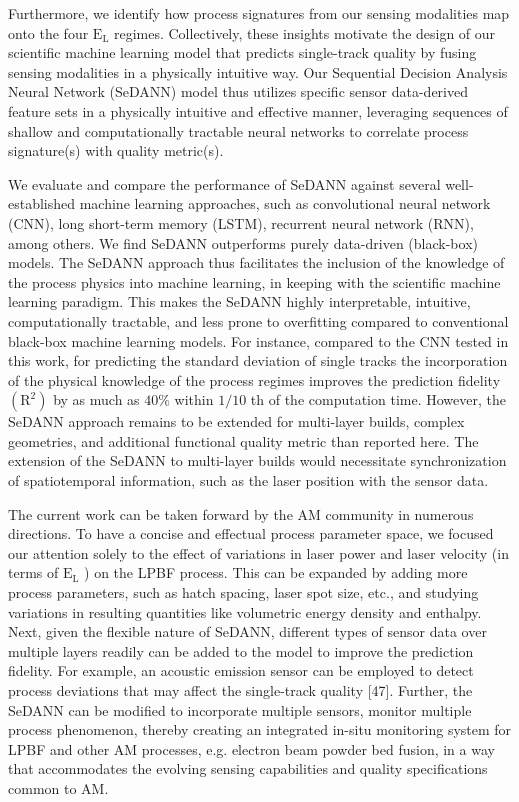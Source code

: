 \documentclass[10pt]{article}
\begin{document}
Furthermore, we identify how process signatures from our sensing modalities map onto the four $\mathrm{E}_{\mathrm{L}}$ regimes. Collectively, these insights motivate the design of our scientific machine learning model that predicts single-track quality by fusing sensing modalities in a physically intuitive way. Our Sequential Decision Analysis Neural Network (SeDANN) model thus utilizes specific sensor data-derived feature sets in a physically intuitive and effective manner, leveraging sequences of shallow and computationally tractable neural networks to correlate process signature(s) with quality metric(s).

We evaluate and compare the performance of SeDANN against several well-established machine learning approaches, such as convolutional neural network (CNN), long short-term memory (LSTM), recurrent neural network (RNN), among others. We find SeDANN outperforms purely data-driven (black-box) models. The SeDANN approach thus facilitates the inclusion of the knowledge of the process physics into machine learning, in keeping with the scientific machine learning paradigm. This makes the SeDANN highly interpretable, intuitive, computationally tractable, and less prone to overfitting compared to conventional black-box machine learning models. For instance, compared to the CNN tested in this work, for predicting the standard deviation of single tracks the incorporation of the physical knowledge of the process regimes improves the prediction fidelity $\left(\mathrm{R}^{2}\right)$ by as much as $40 \%$ within $1 / 10$ th of the computation time. However, the SeDANN approach remains to be extended for multi-layer builds, complex geometries, and additional functional quality metric than reported here. The extension of the SeDANN to multi-layer builds would necessitate synchronization of spatiotemporal information, such as the laser position with the sensor data.

The current work can be taken forward by the AM community in numerous directions. To have a concise and effectual process parameter space, we focused our attention solely to the effect of variations in laser power and laser velocity (in terms of $\mathrm{E}_{\mathrm{L}}$ ) on the LPBF process. This can be expanded by adding more process parameters, such as hatch spacing, laser spot size, etc., and studying variations in resulting quantities like volumetric energy density and enthalpy. Next, given the flexible nature of SeDANN, different types of sensor data over multiple layers readily can be added to the model to improve the prediction fidelity. For example, an acoustic emission sensor can be employed to detect process deviations that may affect the single-track quality [47]. Further, the SeDANN can be modified to incorporate multiple sensors, monitor multiple process phenomenon, thereby creating an integrated in-situ monitoring system for LPBF and other AM processes, e.g. electron beam powder bed fusion, in a way that accommodates the evolving sensing capabilities and quality specifications common to AM.
\end{document}
